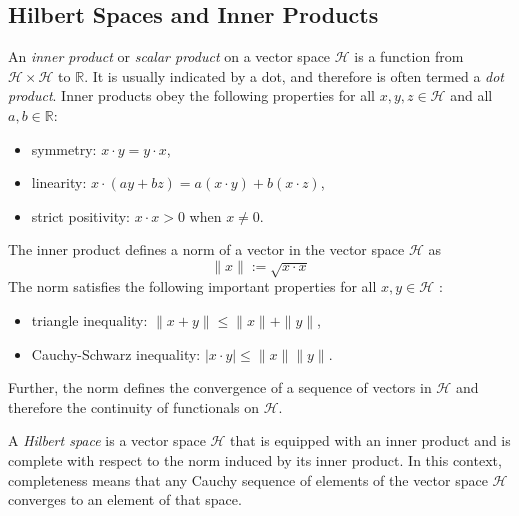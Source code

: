 \documentclass[\topdir/lecture\_notes.tex]{subfiles}
\begin{document}
\subsection{Hilbert Spaces and Inner Products}
An \emph{inner product} or \emph{scalar product} on a vector space $\mathcal{H}$ is a function from $\mathcal{H} \times \mathcal{H}$ to $\mathbb{R}$. It is usually indicated by a dot, and therefore is often termed a \emph{dot product}. Inner products obey the following properties for all $x, y, z \in \mathcal{H}$ and all $a, b \in \mathbb{R}$:
\begin{itemize}
  \item symmetry: $x \cdot y=y \cdot x$,
  \item linearity: $x \cdot(a y+b z)=a(x \cdot y)+b(x \cdot z)$,
  \item strict positivity: $x \cdot x>0$ when $x \neq 0$.
\end{itemize}
The inner product defines a norm of a vector in the vector space $\mathcal{H}$ as
\begin{equation*}
\|x\| := \sqrt{x \cdot x} \label{eq:hilbert_norm} 
\end{equation*}
The norm satisfies the following important properties for all $x, y \in \mathcal{H}$ :
\begin{itemize}
  \item triangle inequality: $\|x+y\| \leq\|x\|+\|y\|$,
  \item Cauchy-Schwarz inequality: $|x \cdot y| \leq\|x\|\|y\|$.
\end{itemize}
Further, the norm defines the convergence of a sequence of vectors in $\mathcal{H}$ and therefore the continuity of functionals on $\mathcal{H}$.

A \emph{Hilbert space} is a vector space $\mathcal{H}$ that is equipped with an inner product and is complete with respect to the norm induced by its inner product. In this context, completeness means that any Cauchy sequence of elements of the vector space $\mathcal{H}$ converges to an element of that space.
\end{document}
